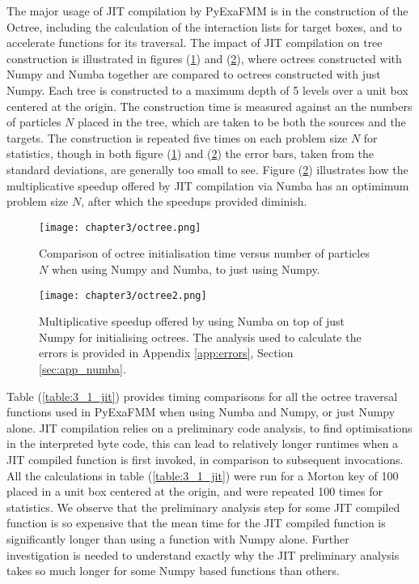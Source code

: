 The major usage of \gls{JIT} compilation by \gls{PyExaFMM} is in the construction
of the Octree, including the calculation of the interaction lists for target
boxes, and to accelerate functions for its traversal. The impact of \gls{JIT}
compilation on tree construction is illustrated in figures
(\ref{fig:3_1_octree}) and (\ref{fig:3_1_octree2}), where octrees constructed with
Numpy and Numba together are compared to octrees constructed with just Numpy.
Each tree is constructed to a maximum depth of 5 levels over a unit box
centered at the origin. The construction time is measured against an
the numbers of particles $N$ placed in the tree, which are taken to be
both the sources and the targets. The construction
is repeated five times on each problem size $N$ for statistics, though in both
figure (\ref{fig:3_1_octree}) and (\ref{fig:3_1_octree2}) the error bars, taken
from the standard deviations, are generally too small to see. Figure (\ref{fig:3_1_octree2})
illustrates how the multiplicative speedup offered by \gls{JIT} compilation via
Numba has an optimimum problem size $N$, after which the speedups provided diminish.

\begin{figure}[ht]
    \centering

  {\texttt{[image: chapter3/octree.png]}}
  \vspace{0pt}
    \caption{
        Comparison of octree initialisation time versus number of particles $N$
        when using Numpy and Numba, to just using Numpy.
    }
    \label{fig:3_1_octree}
\end{figure}

\begin{figure}[ht]
    \centering

  {\texttt{[image: chapter3/octree2.png]}}
  \vspace{0pt}
    \caption{
        Multiplicative speedup offered by using Numba on top of just Numpy for
        initialising octrees.
        The analysis used to calculate the errors is provided in
        Appendix \ref{app:errors}, Section \ref{sec:app_numba}.
    }
    \label{fig:3_1_octree2}
\end{figure}

Table (\ref{table:3_1_jit}) provides timing comparisons for all the octree traversal
functions used in \gls{PyExaFMM} when using Numba and Numpy, or just Numpy alone.
\gls{JIT} compilation relies on a preliminary code analysis, to find optimisations
in the interpreted byte code, this can lead to relatively longer runtimes when
a \gls{JIT} compiled function is first invoked, in comparison to subsequent
invocations. All the calculations in table (\ref{table:3_1_jit}) were run for a
Morton key of 100 placed in a unit box centered at the origin, and were repeated
100 times for statistics. We observe that the preliminary analysis step for
some \gls{JIT} compiled function is so expensive that the mean time for the \gls{JIT}
compiled function is significantly longer than using a function with Numpy alone.
Further investigation is needed to understand exactly why the \gls{JIT} preliminary
analysis takes so much longer for some Numpy based functions than others.

